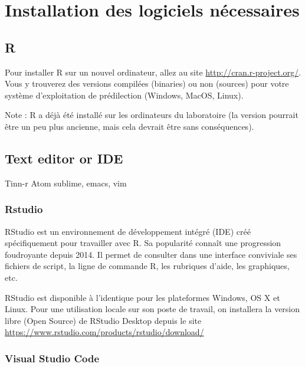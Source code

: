 \documentclass[
  12pt,
]{book}
\begin{document}
\hypertarget{installation-des-logiciels-nuxe9cessaires}{%
\section*{Installation des logiciels nécessaires}\label{installation-des-logiciels-nuxe9cessaires}}

\hypertarget{r}{%
\subsection*{R}\label{r}}

Pour installer R sur un nouvel ordinateur, allez au site \url{http://cran.r-project.org/}.
Vous y trouverez des versions compilées (binaries) ou non (sources) pour votre système d'exploitation de prédilection (Windows, MacOS, Linux).

Note : R a déjà été installé sur les ordinateurs du laboratoire (la version pourrait être un peu plus ancienne, mais cela devrait être sans conséquences).

\hypertarget{text-editor-or-ide}{%
\subsection{Text editor or IDE}\label{text-editor-or-ide}}

Tinn-r
Atom sublime, emacs, vim

\hypertarget{rstudio}{%
\subsubsection*{Rstudio}\label{rstudio}}

RStudio est un environnement de développement intégré (IDE) créé spécifiquement pour travailler avec R. Sa popularité connaît une progression foudroyante depuis 2014.
Il permet de consulter dans une interface conviviale ses fichiers de script, la ligne de commande R, les rubriques d'aide,
les graphiques, etc.

RStudio est disponible à l'identique pour les plateformes Windows, OS X et Linux.
Pour une utilisation locale sur son poste de travail, on installera la version libre (Open Source) de RStudio Desktop depuis le site
\url{https://www.rstudio.com/products/rstudio/download/}

\hypertarget{visual-studio-code}{%
\subsubsection*{Visual Studio Code}\label{visual-studio-code}}
\end{document}
